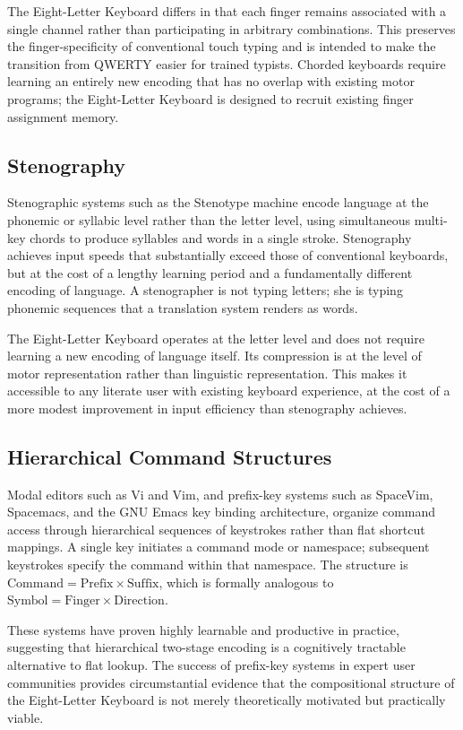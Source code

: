 \documentclass[12pt,a4paper]{article}
\theoremstyle{plain}
\theoremstyle{definition}
\theoremstyle{remark}
\begin{document}
The Eight-Letter Keyboard differs in that each finger remains associated with a
single channel rather than participating in arbitrary combinations. This preserves
the finger-specificity of conventional touch typing and is intended to make the
transition from QWERTY easier for trained typists. Chorded keyboards require
learning an entirely new encoding that has no overlap with existing motor
programs; the Eight-Letter Keyboard is designed to recruit existing finger
assignment memory.

\subsection{Stenography}

Stenographic systems such as the Stenotype machine encode language at the
phonemic or syllabic level rather than the letter level, using simultaneous
multi-key chords to produce syllables and words in a single stroke. Stenography
achieves input speeds that substantially exceed those of conventional keyboards,
but at the cost of a lengthy learning period and a fundamentally different
encoding of language. A stenographer is not typing letters; she is typing
phonemic sequences that a translation system renders as words.

The Eight-Letter Keyboard operates at the letter level and does not require
learning a new encoding of language itself. Its compression is at the level of
motor representation rather than linguistic representation. This makes it
accessible to any literate user with existing keyboard experience, at the cost
of a more modest improvement in input efficiency than stenography achieves.

\subsection{Hierarchical Command Structures}

Modal editors such as Vi and Vim, and prefix-key systems such as SpaceVim,
Spacemacs, and the GNU Emacs key binding architecture, organize command access
through hierarchical sequences of keystrokes rather than flat shortcut mappings.
A single key initiates a command mode or namespace; subsequent keystrokes
specify the command within that namespace. The structure is
$\text{Command} = \text{Prefix} \times \text{Suffix}$, which is formally
analogous to $\text{Symbol} = \text{Finger} \times \text{Direction}$.

These systems have proven highly learnable and productive in practice, suggesting
that hierarchical two-stage encoding is a cognitively tractable alternative to
flat lookup. The success of prefix-key systems in expert user communities provides
circumstantial evidence that the compositional structure of the Eight-Letter
Keyboard is not merely theoretically motivated but practically viable.
\end{document}
